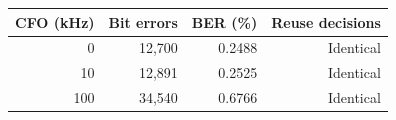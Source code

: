 \begin{tabular}{rrrr}\toprule
CFO (kHz) & Bit errors & BER (\%) & Reuse decisions\\\midrule
0 & 12,700 & 0.2488 & Identical \\
10 & 12,891 & 0.2525 & Identical \\
100 & 34,540 & 0.6766 & Identical \\
\bottomrule\end{tabular}
